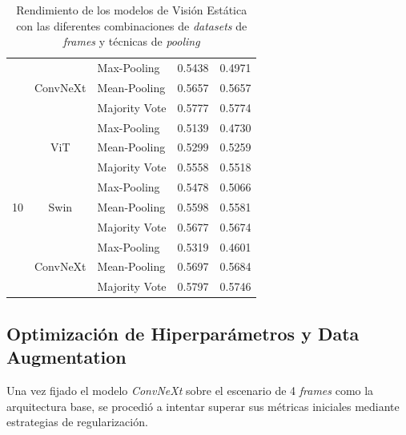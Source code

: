 \begin{table}[H]
\begin{tabular}{cclcc}
            & \multirow{3}{*}{ConvNeXt} 
                & Max-Pooling   & 0.5438 & 0.4971 \\
            &   & Mean-Pooling  & 0.5657 & 0.5657 \\
            &   & Majority Vote & 0.5777 & 0.5774 \\
            
        \midrule

        \multirow{9}{*}{10} 
            & \multirow{3}{*}{ViT} 
                & Max-Pooling   & 0.5139 & 0.4730 \\
            &   & Mean-Pooling  & 0.5299 & 0.5259 \\
            &   & Majority Vote & 0.5558 & 0.5518 \\
            \cmidrule{2-5} %
            
            & \multirow{3}{*}{Swin} 
                & Max-Pooling   & 0.5478 & 0.5066 \\
            &   & Mean-Pooling  & 0.5598 & 0.5581 \\
            &   & Majority Vote & 0.5677 & 0.5674 \\
            \cmidrule{2-5}
            
            & \multirow{3}{*}{ConvNeXt} 
                & Max-Pooling   & 0.5319 & 0.4601 \\
            &   & Mean-Pooling  & 0.5697 & 0.5684 \\
            &   & Majority Vote & 0.5797 & 0.5746 \\
            
        \bottomrule
    \end{tabular}
    \caption{Rendimiento de los modelos de Visión Estática con las diferentes combinaciones de \textit{datasets} de \textit{frames} y técnicas de \textit{pooling}}
    \label{tab:ResultadosModelosVisionEstatica}
\end{table}

\subsection{Optimización de Hiperparámetros y Data Augmentation}
\label{subsec:OptimizacionDeHiperparametrosYDataAugmentation}
Una vez fijado el modelo \textit{ConvNeXt} sobre el escenario de 4 \textit{frames} como la arquitectura base, se procedió a intentar superar sus métricas iniciales mediante estrategias de regularización.

